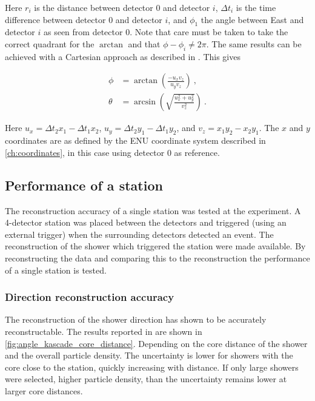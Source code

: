 Here $r_i$ is the distance between detector 0 and detector $i$, $\Delta t_i$ is the time difference between detector 0 and detector $i$, and $\phi_1$ the angle between East and detector $i$ as seen from detector 0. Note that care must be taken to take the correct quadrant for the $\arctan$ and that $\phi - \phi_i \ne 2 \pi$. The same results can be achieved with a Cartesian approach as described in \cite{montanus2015direction}. This gives

\begin{equation}
    \label{eq:direction-2dflat-cart}
    \begin{split}
        \phi &= \arctan \left(\frac{-u_x v_z}{u_y v_z} \right) \ , \\
        \theta &= \arcsin \left(\sqrt{\frac{u_x^2+u_y^2}{v_z^2}} \right) \ .
    \end{split}
\end{equation}

Here $u_x = \Delta t_2 x_1 - \Delta t_1 x_2$, $u_y = \Delta t_2 y_1 - \Delta t_1 y_2$, and $v_z = x_1 y_2 - x_2 y_1$. The $x$ and $y$ coordinates are as defined by the ENU coordinate system described in \cref{ch:coordinates}, in this case using detector 0 as reference.


\subsection{Performance of a station}

The reconstruction accuracy of a single \hisparc station was tested at the \kascade experiment. A 4-detector \hisparc station was placed between the \kascade detectors and triggered (using an external trigger) when the surrounding \kascade detectors detected an event. The \kascade reconstruction of the shower which triggered the \hisparc station were made available. By reconstructing the \hisparc data and comparing this to the \kascade reconstruction the performance of a single station is tested.


\subsubsection{Direction reconstruction accuracy}

The reconstruction of the shower direction has shown to be accurately reconstructable. The results reported in \cite{fokkema2012hisparc} are shown in \cref{fig:angle_kascade_core_distance}. Depending on the core distance of the shower and the overall particle density. The uncertainty is lower for showers with the core close to the station, quickly increasing with distance. If only large showers were selected, higher particle density, than the uncertainty remains lower at larger core distances.

